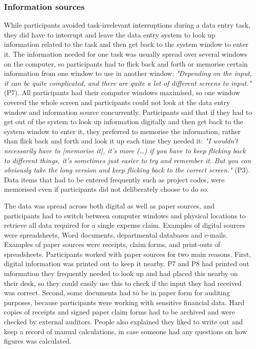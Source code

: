 \subsubsection{Information sources}
While participants avoided task-irrelevant interruptions during a data entry task, they did have to interrupt and leave the data entry system to look up information related to the task and then get back to the system window to enter it. The information needed for one task was usually spread over several windows on the computer, so participants had to flick back and forth or memorise certain information from one window to use in another window: \textit{"Depending on the input, it can be quite complicated, and there are quite a lot of different screens to input."} (P7). All participants had their computer windows maximised, so one window covered the whole screen and participants could not look at the data entry window and information source concurrently. Participants said that if they had to get out of the system to look up information digitally and then get back to the system window to enter it, they preferred to memorise the information, rather than flick back and forth and look it up each time they needed it: \textit{"I wouldn't necessarily have to [memorise it], it's more (…) if you have to keep flicking back to different things, it's sometimes just easier to try and remember it. But you can obviously take the long version and keep flicking back to the correct screen."} (P3). Data items that had to be entered frequently such as project codes, were memorised even if participants did not deliberately choose to do so.

The data was spread across both digital as well as paper sources, and participants had to switch between computer windows and physical locations to retrieve all data required for a single expense claim. Examples of digital sources were spreadsheets, Word documents, departmental databases and e-mails. Examples of paper sources were receipts, claim forms, and print-outs of spreadsheets. Participants worked with paper sources for two main reasons. First, digital information was printed out to keep it nearby. P7 and P8 had printed out information they frequently needed to look up and had placed this nearby on their desk, so they could easily use this to check if the input they had received was correct. Second, some documents had to be in paper form for auditing purposes, because participants were working with sensitive financial data. Hard copies of receipts and signed paper claim forms had to be archived and were checked by external auditors. People also explained they liked to write out and keep a record of manual calculations, in case someone had any questions on how figures was calculated.

